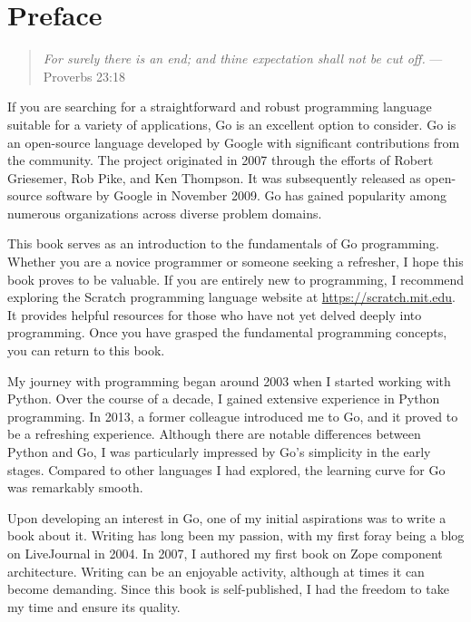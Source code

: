 \cleardoublepage
{}
\chapter*{Preface}

\begin{quote}
\textit{For surely there is an end; and thine expectation shall not be cut
off.} --- Proverbs 23:18
\end{quote}

If you are searching for a straightforward and robust programming language
suitable for a variety of applications, Go is an excellent option to consider.
Go is an open-source language developed by Google with significant contributions
from the community. The project originated in 2007 through the efforts of Robert
Griesemer, Rob Pike, and Ken Thompson. It was subsequently released as
open-source software by Google in November 2009. Go has gained popularity among
numerous organizations across diverse problem domains.

This book serves as an introduction to the fundamentals of Go programming.
Whether you are a novice programmer or someone seeking a refresher, I hope this
book proves to be valuable. If you are entirely new to programming, I recommend
exploring the Scratch programming language website
at \url{https://scratch.mit.edu}. It provides helpful resources for those who
have not yet delved deeply into programming. Once you have grasped the
fundamental programming concepts, you can return to this book.

My journey with programming began around 2003 when I started working with
Python. Over the course of a decade, I gained extensive experience in Python
programming. In 2013, a former colleague introduced me to Go, and it proved to
be a refreshing experience. Although there are notable differences between
Python and Go, I was particularly impressed by Go's simplicity in the early
stages. Compared to other languages I had explored, the learning curve for Go
was remarkably smooth.

Upon developing an interest in Go, one of my initial aspirations was to write a
book about it. Writing has long been my passion, with my first foray being a
blog on LiveJournal in 2004. In 2007, I authored my first book on Zope component
architecture. Writing can be an enjoyable activity, although at times it can
become demanding. Since this book is self-published, I had the freedom to take
my time and ensure its quality.

